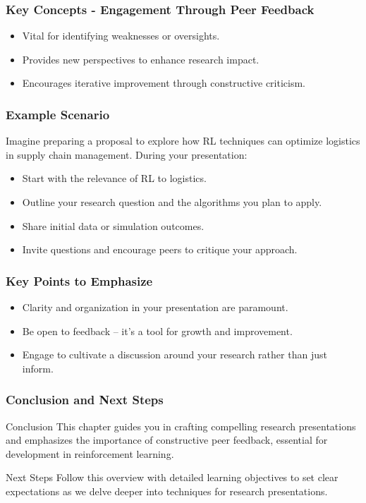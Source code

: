 \documentclass[aspectratio=169]{beamer}
\begin{document}
\begin{frame}[fragile]
    \frametitle{Key Concepts - Engagement Through Peer Feedback}
    \begin{itemize}
        \item Vital for identifying weaknesses or oversights.
        \item Provides new perspectives to enhance research impact.
        \item Encourages iterative improvement through constructive criticism.
    \end{itemize}
\end{frame}

\begin{frame}[fragile]
    \frametitle{Example Scenario}
    Imagine preparing a proposal to explore how RL techniques can optimize logistics in supply chain management. During your presentation:
    \begin{itemize}
        \item Start with the relevance of RL to logistics.
        \item Outline your research question and the algorithms you plan to apply.
        \item Share initial data or simulation outcomes.
        \item Invite questions and encourage peers to critique your approach.
    \end{itemize}
\end{frame}

\begin{frame}[fragile]
    \frametitle{Key Points to Emphasize}
    \begin{itemize}
        \item Clarity and organization in your presentation are paramount.
        \item Be open to feedback – it’s a tool for growth and improvement.
        \item Engage to cultivate a discussion around your research rather than just inform.
    \end{itemize}
\end{frame}

\begin{frame}[fragile]
    \frametitle{Conclusion and Next Steps}
    \begin{block}{Conclusion}
        This chapter guides you in crafting compelling research presentations and emphasizes the importance of constructive peer feedback, essential for development in reinforcement learning.
    \end{block}
    \begin{block}{Next Steps}
        Follow this overview with detailed learning objectives to set clear expectations as we delve deeper into techniques for research presentations.
    \end{block}
\end{frame}
\end{document}
